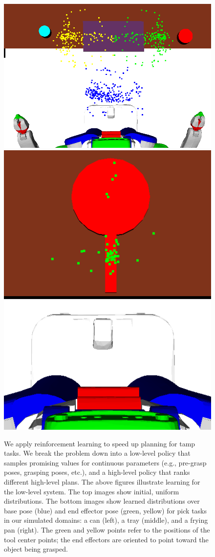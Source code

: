 \begin{figure}[t]
    \includegraphics[scale=0.13]{images/dinner_tray_final.png}
    \includegraphics[scale=0.13]{images/frying_final.png}
  \caption{\small{We apply reinforcement learning to speed up planning
      for {\sc tamp} tasks. We break the problem down into a low-level
      policy that samples promising values for continuous parameters
      (e.g., pre-grasp poses, grasping poses, etc.), and a high-level
      policy that ranks different high-level plans. The above figures
      illustrate learning for the low-level system. The top images
      show initial, uniform distributions. The bottom images show
      learned distributions over base pose (blue) and end effector
      pose (green, yellow) for pick tasks in our simulated domains: a
      can (left), a tray (middle), and a frying pan (right).  The
      green and yellow points refer to the positions of the tool
      center points; the end effectors are oriented to point toward
      the object being grasped.}}
  \label{fig:cover}
\end{figure}

